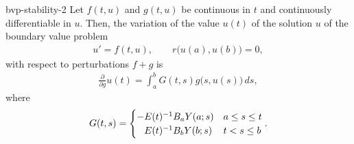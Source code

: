 \begin{Theorem}{bvp-stability-2}
  Let $f(t,u)$ and $g(t,u)$ be continuous in $t$ and continuously
  differentiable in $u$. Then, the variation of the value $u(t)$ of
  the solution $u$ of the boundary value problem
  \begin{gather*}
    u'=f(t,u),\qquad r\bigl(u(a), u(b)\bigr)=0,
  \end{gather*}
  with respect to perturbations $f+g$ is
  \begin{gather}
    \label{eq:bvp-stability-2:1}
    \frac{\partial}{\partial g} u(t)
    = \int_{a}^b G(t,s) g\bigl(s,u(s)\bigr)\,d s,
  \end{gather}
  where
  \begin{gather}
    \label{eq:bvp-stability-2:2}
    G(t,s) =
    \begin{cases}
      -E(t)^{-1} \rwaa \fundamental(a;s) & a \le s \le t \\
      \phantom{-}E(t)^{-1} \rwab \fundamental(b;s) & t < s \le b
    \end{cases}.
  \end{gather}
\end{Theorem}

